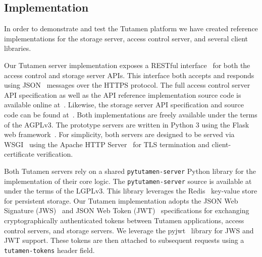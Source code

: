 \subsection{Implementation}

In order to demonstrate and test the Tutamen platform we have created
reference implementations for the storage server, access control
server, and several client libraries.

Our Tutamen server implementation exposes a RESTful
interface~\cite{fielding2000} for both the access control and storage
server APIs. This interface both accepts and responds using
JSON~\cite{json} messages over the HTTPS protocol. The full access
control server API specification as well as the API reference
implementation source code is available online
at~\cite{src-tutamen-apiaccesscontrol}. Likewise, the storage server
API specification and source code can be found
at~\cite{src-tutamen-apistorage}. Both implementations are freely
available under the terms of the AGPLv3. The prototype servers are
written in Python 3 using the Flask web
framework~\cite{python-flask}. For simplicity, both servers are
designed to be served via WSGI~\cite{pep3333} using the Apache HTTP
Server~\cite{apache} for TLS termination and client-certificate
verification.

Both Tutamen servers rely on a shared \texttt{pytutamen-server} Python
library for the implementation of their core logic. The
\texttt{pytutamen-server} source is available
at~\cite{src-tutamen-pytutamenserver} under the terms of the
LGPLv3. This library leverages the Redis~\cite{redis} key-value store
for persistent storage. Our Tutamen implementation adopts the JSON Web
Signature (JWS)~\cite{rfc7515} and JSON Web Token (JWT)~\cite{rfc7519}
specifications for exchanging cryptographically authenticated tokens
between Tutamen applications, access control servers, and storage
servers. We leverage the pyjwt~\cite{pyjwt} library for JWS and JWT
support. These tokens are then attached to subsequent requests using a
\texttt{tutamen-tokens} header field.

